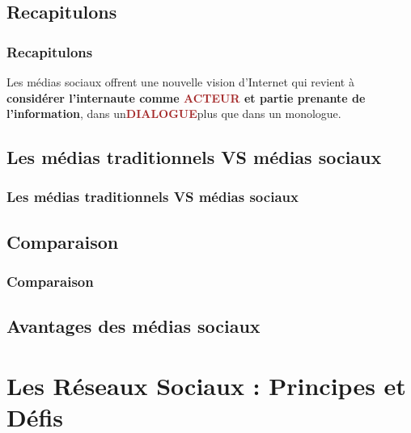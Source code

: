 \documentclass{beamer}
\begin{document}
  \subsection{Recapitulons}
   \begin{frame}
    \frametitle{Recapitulons}
    Les médias sociaux offrent une nouvelle vision d’Internet qui revient à \textbf{considérer l’internaute comme \textcolor{brown}{ACTEUR} et partie prenante de l’information}, dans un\textbf{\textcolor{brown}{DIALOGUE}}plus que dans un monologue.
   \end{frame}

  \subsection{Les médias traditionnels VS médias sociaux}
   \begin{frame}
   \frametitle{Les médias traditionnels VS médias sociaux}
   \end{frame}

  \subsection{Comparaison}
   \begin{frame}
    \frametitle{Comparaison}
    \begin{center}
    \end{center}
   \end{frame}

  \subsection{Avantages des médias sociaux }
   \begin{frame}
    
   \end{frame}


\section{Les Réseaux Sociaux : Principes et Défis}
\end{document}

